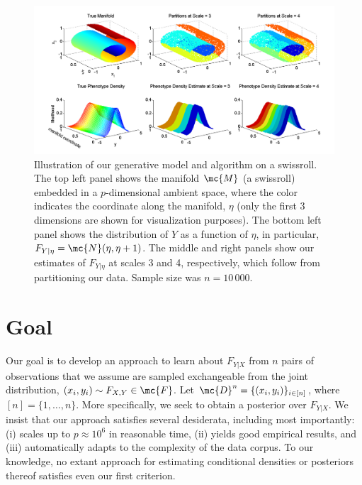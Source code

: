 \begin{figure}[htbp]
	\centering
		\includegraphics[width=1\linewidth]{../figs/PartitionsDensity_27MAY}
	\caption{Illustration of our generative model and algorithm on a swissroll. The top left panel shows the manifold $\mc{M}$ (a swissroll) embedded in a $p$-dimensional ambient space, where the color indicates the coordinate along the manifold, $\eta$ (only the first 3 dimensions are shown for visualization purposes). The bottom left panel shows the distribution of $Y$ as a function of $\eta$, in particular, $F_{Y|\eta}=\mc{N}({\eta},{\eta}+1)$. The middle and right panels show our estimates of $F_{Y|{\eta}}$ at scales 3 and 4, respectively, which follow from partitioning our data.  Sample size was $n=10\,000$.}
	\label{fig:swiss}
\end{figure}


\section{Goal} \label{sec:goal}

Our goal is to develop an approach to learn about $F_{Y|X}$ from $n$ pairs of observations that we assume are sampled exchangeable from the joint distribution, $(x_i,y_i) \sim F_{X,Y} \in \mc{F}$. Let $\mc{D}^n=\{(x_i,y_i)\}_{i \in [n]}$, where $[n]=\{1,\ldots, n\}$.  More specifically, we seek to obtain a posterior over $F_{Y|X}$.  We insist that our approach satisfies several desiderata, including most importantly: (i) scales up to $p \approx 10^6$ in reasonable time,  (ii) yields good empirical results, and (iii) automatically adapts to the complexity of the data corpus.  To our knowledge, no extant approach for estimating conditional densities or posteriors thereof satisfies even our first criterion. 


